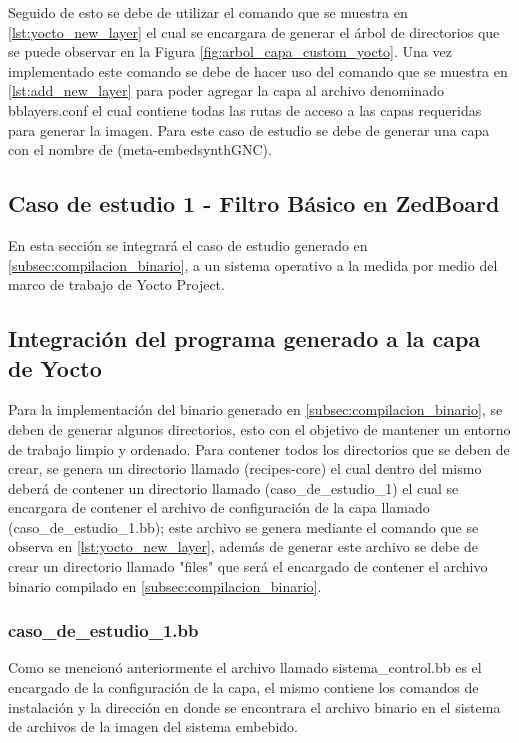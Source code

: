 Seguido de esto se debe de utilizar el comando que se muestra en \ref{lst:yocto_new_layer} el cual se encargara de generar el árbol de directorios que se puede observar en la Figura \ref{fig:arbol_capa_custom_yocto}. Una vez implementado este comando se debe de hacer uso del comando que se muestra en \ref{lst:add_new_layer} para poder agregar la capa al archivo denominado bblayers.conf el cual contiene todas las rutas de acceso a las capas requeridas para generar la imagen. Para este caso de estudio se debe de generar una capa con el nombre de (meta-embedsynthGNC).


\subsection{Caso de estudio 1 - Filtro Básico en ZedBoard}

En esta sección se integrará el caso de estudio generado en \ref{subsec:compilacion_binario}, a un sistema operativo a la medida por medio del marco de trabajo de Yocto Project.

\subsection{Integración del programa generado a la capa de Yocto}

Para la implementación del binario generado en \ref{subsec:compilacion_binario}, se deben de generar algunos directorios, esto con el objetivo de mantener un entorno de trabajo limpio y ordenado. Para contener todos los directorios que se deben de crear, se genera un directorio llamado (recipes-core) el cual dentro del mismo deberá de contener un directorio llamado (caso\_de\_estudio\_1) el cual se encargara de contener el archivo de configuración de la capa llamado (caso\_de\_estudio\_1.bb); este archivo se genera mediante el comando que se observa en \ref{lst:yocto_new_layer}, además de generar este archivo se debe de crear un directorio llamado "files" que será el encargado de contener el archivo binario compilado en \ref{subsec:compilacion_binario}.

\subsubsection{caso\_de\_estudio\_1.bb}

Como se mencionó anteriormente el archivo llamado sistema\_control.bb es el encargado de la configuración de la capa, el mismo contiene los comandos de instalación y la dirección en donde se encontrara el archivo binario en el sistema de archivos de la imagen del sistema embebido.

